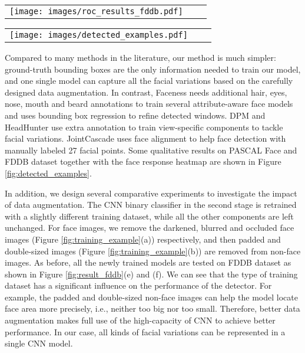 \documentclass[10pt,twocolumn,letterpaper]{article}
\begin{document}
\begin{figure*}
\begin{tabular}{ccc}
\rule{0pt}{1ex}\hspace{2.24mm}\texttt{[image: images/roc\_results\_fddb.pdf]}\\[-0.1pt]
\end{tabular}
\caption{Performance comparison on FDDB dataset with discrete and continuous protocols.}
\label{fig:result_fddb}
\end{figure*}


\begin{figure*}
\begin{tabular}{ccc}
\rule{0pt}{1ex}\hspace{2.24mm}\texttt{[image: images/detected\_examples.pdf]}\\[-0.1pt]
\end{tabular}
\caption{Qualitative face detection results and face response heatmap by our detector on PASCAL face (top two rows) and FDDB dataset (bottom two rows).}
\label{fig:detected_examples}
\end{figure*}

Compared to many methods in the literature, our method is much simpler: ground-truth bounding boxes are the only information needed to train our model, and one single model can capture all the facial variations based on the carefully designed data augmentation. In contrast, Faceness \cite{yang2015facial} needs additional hair, eyes, nose, mouth and beard annotations to train several attribute-aware face models and uses bounding box regression to refine detected windows. DPM and HeadHunter \cite{mathias2014face} use extra annotation to train view-specific components to tackle facial variations. JointCascade \cite{chen2014joint} uses face alignment to help face detection with manually labeled 27 facial points. Some qualitative results on PASCAL Face and FDDB dataset together with the face response heatmap are shown in Figure \ref{fig:detected_examples}.

In addition, we design several comparative experiments to investigate the impact of data augmentation. The CNN binary classifier in the second stage is retrained with a slightly different training dataset, while all the other components are left unchanged. For face images, we remove the darkened, blurred and occluded face images (Figure \ref{fig:training_example}(a)) respectively, and then padded and double-sized images (Figure \ref{fig:training_example}(b)) are removed from non-face images. As before, all the newly trained models are tested on FDDB dataset as shown in Figure \ref{fig:result_fddb}(e) and (f). We can see that the type of training dataset has a significant influence on the performance of the detector. For example, the padded and double-sized non-face images can help the model locate face area more precisely, i.e., neither too big nor too small. Therefore, better data augmentation makes full use of the high-capacity of CNN to achieve better performance. In our case, all kinds of facial variations can be represented in a single CNN model.
\end{document}
